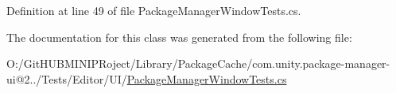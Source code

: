 Definition at line 49 of file Package\+Manager\+Window\+Tests.\+cs.



The documentation for this class was generated from the following file\+:\begin{DoxyCompactItemize}
\item 
O\+:/\+Git\+H\+U\+B\+M\+I\+N\+I\+P\+Roject/\+Library/\+Package\+Cache/com.\+unity.\+package-\/manager-\/ui@2../\+Tests/\+Editor/\+U\+I/\mbox{\hyperlink{_package_manager_window_tests_8cs}{Package\+Manager\+Window\+Tests.\+cs}}\end{DoxyCompactItemize}
